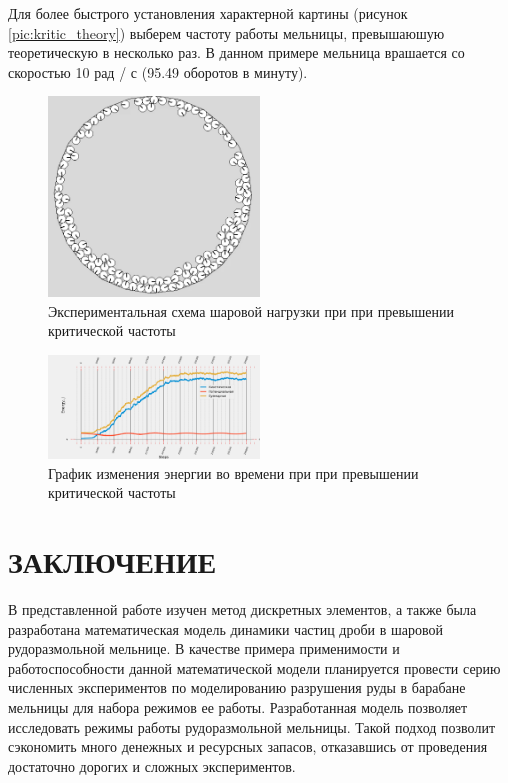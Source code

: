 \documentclass[utf8x, 14pt, oneside, a4paper]{article}
\begin{document}
Для более быстрого установления характерной картины (рисунок \ref{pic:kritic_theory}) выберем частоту работы мельницы, превышаюшую теоретическую в несколько раз.
В данном примере мельница врашается со скоростью 10 рад / с (95.49 оборотов в минуту).

\begin{figure}[H]
	\centering
	\includegraphics[width=0.5\textwidth]{kritic_result} 
	\caption{Экспериментальная схема шаровой нагрузки при при превышении критической частоты}
	\label{pic:kritic_result}
\end{figure} 

\begin{figure}[H]
	\centering
	\includegraphics[width=0.5\textwidth]{kritic_energy} 
	\caption{График изменения энергии во времени при при превышении критической частоты}
	\label{pic:kritic_energy}
\end{figure} 


		\pagebreak
		
	\section*{ЗАКЛЮЧЕНИЕ}

В представленной работе изучен метод дискретных элементов, а также была разработана математическая модель динамики частиц дроби в шаровой рудоразмольной мельнице.
В качестве примера применимости и работоспособности данной математической модели планируется провести серию численных экспериментов по моделированию разрушения руды в барабане мельницы для набора режимов ее работы.
Разработанная модель позволяет исследовать режимы работы рудоразмольной мельницы.
Такой подход позволит сэкономить много денежных и ресурсных запасов, отказавшись от проведения достаточно дорогих и сложных экспериментов.
\end{document}
